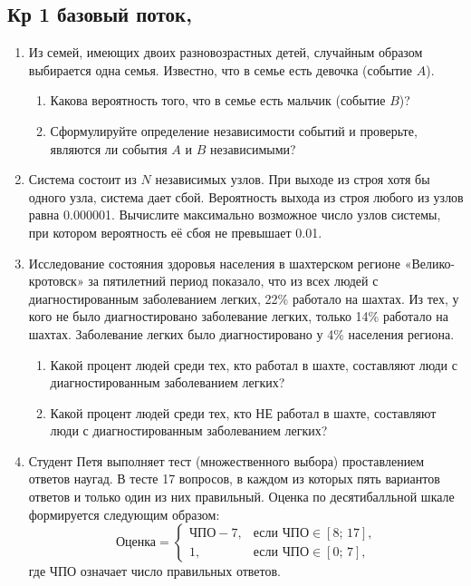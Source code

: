 
\subsection{Кр 1 базовый поток, }


\begin{enumerate}
\item  Из семей, имеющих двоих разновозрастных детей, случайным образом выбирается одна семья. Известно, что в семье есть девочка (событие $A$).

\begin{enumerate}
\item	Какова вероятность того, что в семье есть мальчик (событие $B$)?

\item	Сформулируйте определение независимости событий и проверьте, являются ли события $A$ и $B$ независимыми?
\end{enumerate}

\item  Система состоит из $N$ независимых узлов. При выходе из строя хотя бы одного узла, система дает сбой. Вероятность выхода из строя любого из узлов равна 0.000001. Вычислите максимально возможное число узлов системы, при котором вероятность её сбоя не превышает 0.01.

\item  Исследование состояния здоровья населения в шахтерском регионе «Велико-кротовск» за пятилетний период показало, что из всех людей с диагностированным заболеванием легких, 22\% работало на шахтах. Из тех, у кого не было диагностировано заболевание легких, только 14\% работало на шахтах. Заболевание легких было диагностировано у 4\% населения региона.

\begin{enumerate}
\item	Какой процент людей среди тех, кто работал в шахте, составляют люди с диагностированным заболеванием легких?

\item	Какой процент людей среди тех, кто НЕ работал в шахте, составляют люди с диагностированным заболеванием легких?
\end{enumerate}

\item  Студент Петя выполняет тест (множественного выбора) проставлением ответов наугад. В тесте 17 вопросов, в каждом из которых пять вариантов ответов и только один из них правильный. Оценка по десятибалльной шкале формируется следующим образом:
\[
    \text{Оценка} = \left\{
                      \begin{array}{ll}
                        \text{ЧПО} - 7, & \text{если $\text{ЧПО}\in [8;\,17]$,} \\
                        1,              & \text{если $\text{ЧПО}\in [0;\,7]$,}
                      \end{array}
                    \right.
\]
где ЧПО означает число правильных ответов.


\end{enumerate}
